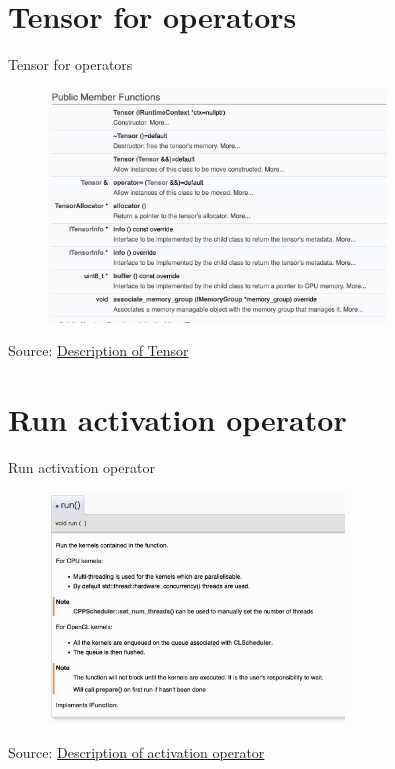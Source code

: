 \documentclass{beamer}
\begin{document}
\section{Tensor for operators}
\begin{frame}{Tensor for operators}
  \begin{figure}[h]
    \includegraphics[width=0.8\textwidth]{images/tensor.png}
  \end{figure}
  \footnotesize Source: \href{https://artificial-intelligence.sites.arm.com/computelibrary/latest/classarm__compute_1_1_tensor.xhtml}{Description of Tensor}
\end{frame}

\section{Run activation operator}
\begin{frame}{Run activation operator}
  \begin{figure}[h]
    \includegraphics[width=0.7\textwidth]{images/run.png}
  \end{figure}
  \footnotesize Source: \href{https://artificial-intelligence.sites.arm.com/computelibrary/latest/classarm__compute_1_1_n_e_activation_layer.xhtml}{Description of activation operator}
\end{frame}
\end{document}
